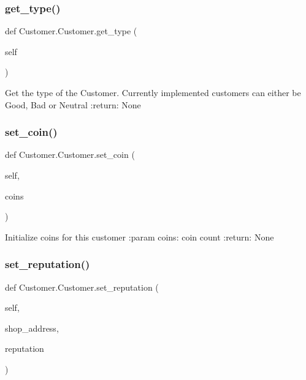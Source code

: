 \subsubsection{\texorpdfstring{get\+\_\+type()}{get\_type()}}
{\footnotesize\ttfamily def Customer.\+Customer.\+get\+\_\+type (\begin{DoxyParamCaption}\item[{}]{self }\end{DoxyParamCaption})}

\begin{DoxyVerb}Get the type of the Customer. Currently implemented customers can either be Good, Bad or Neutral
:return: None
\end{DoxyVerb}
 \mbox{\label{class_customer_1_1_customer_a61ab0c880d31a2f0d87d71f9d708ca45}} 
\subsubsection{\texorpdfstring{set\+\_\+coin()}{set\_coin()}}
{\footnotesize\ttfamily def Customer.\+Customer.\+set\+\_\+coin (\begin{DoxyParamCaption}\item[{}]{self,  }\item[{}]{coins }\end{DoxyParamCaption})}

\begin{DoxyVerb}Initialize coins for this customer
:param coins: coin count
:return: None
\end{DoxyVerb}
 \mbox{\label{class_customer_1_1_customer_a7179b6123d3b732082c5724e7d416ab3}} 
\subsubsection{\texorpdfstring{set\+\_\+reputation()}{set\_reputation()}}
{\footnotesize\ttfamily def Customer.\+Customer.\+set\+\_\+reputation (\begin{DoxyParamCaption}\item[{}]{self,  }\item[{}]{shop\+\_\+address,  }\item[{}]{reputation }\end{DoxyParamCaption})}

